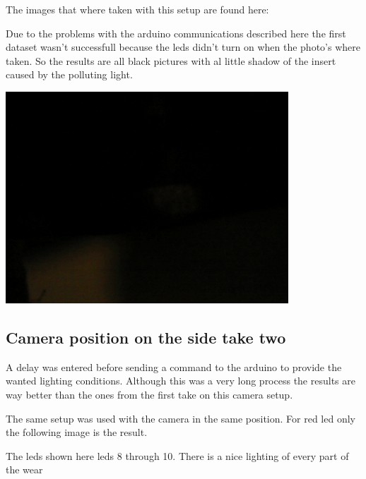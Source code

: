\documentclass{article}
\begin{document}
The images that where taken with this setup are found here:

Due to the problems with the arduino communications described here the first dataset wasn't successfull because the leds didn't turn on when the photo's where taken. So the results are all black pictures with al little shadow of the insert caused by the polluting light. 



\includegraphics[width=4.166667in, keepaspectratio=true]{./ZimFiles_files/Vision/Dataset/automated_datasets/1_check_camera_position/1_camera_position_side/p3_l6_black.png}



\subsection{Camera position on the side take two}



A delay was entered before sending a command to the arduino to provide the wanted lighting conditions. Although this was a very long process the results are way better than the ones from the first take on this camera setup. 



The same setup was used with the camera in the same position. For red led only the following image is the result.



The leds shown here leds 8 through 10. There is a nice lighting of every part of the wear
\end{document}
